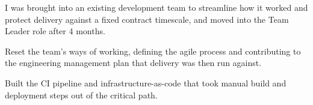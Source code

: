 I was brought into an existing development team to streamline how it worked and protect delivery against a fixed contract timescale, and moved into the Team Leader role after 4 months.
\vspace{0.25em}
\begin{tightemize}
  \item Reset the team's ways of working, defining the agile process and contributing to the engineering management plan that delivery was then run against.
  \item Built the CI pipeline and infrastructure-as-code that took manual build and deployment steps out of the critical path.
\end{tightemize}
\sectionsep{}
\vfill{}
